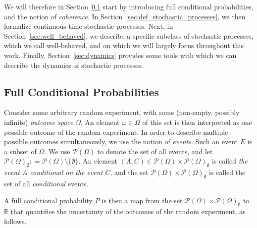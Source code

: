\documentclass[10pt,a4paper]{paper}
\theoremstyle{definition}
\newcommand{\reals}{\mathbb{R}}
\newcommand{\paths}{\Omega}
\newcommand{\power}{\mathcal{P}(\paths)}
\newcommand{\nonemptypower}{\power_{\emptyset}}
\newcommand{\coloneqq}{:\!=}
\begin{document}
We will therefore in Section~\ref{sec:cond_prob} start by introducing full conditional probabilities, and the notion of \emph{coherence}. In Section~\ref{sec:def_stochastic_processes}, we then formalize continuous-time stochastic processes. Next, in Section~\ref{sec:well_behaved}, we describe a specific subclass of stochastic processes, which we call well-behaved, and on which we will largely focus throughout this work. Finally, Section~\ref{sec:dynamics} provides some tools with which we can describe the dynamics of stochastic processes.

\subsection{Full Conditional Probabilities}\label{sec:cond_prob}


Consider some arbitrary random experiment, with some (non-empty, possibly infinite) \emph{outcome space} $\Omega$. An element $\omega\in\Omega$ of this set is then interpreted as one possible outcome of the random experiment. In order to describe multiple possible outcomes simultaneously, we use the notion of \emph{events}. Such an event $E$ is a subset of $\Omega$. We use $\power$ to denote the set of all events, and let $\nonemptypower\coloneqq\power\setminus\{\emptyset\}$. An element $(A,C)\in\power\times\nonemptypower$ is called \emph{the event $A$ conditional on the event $C$}, and the set $\power\times\nonemptypower$ is called the set of all \emph{conditional} events. 

A full conditional probability $P$ is then a map from the set $\power\times\nonemptypower$ to $\reals$ that quantifies the uncertainty of the outcomes of the random experiment, as follows.
\end{document}
